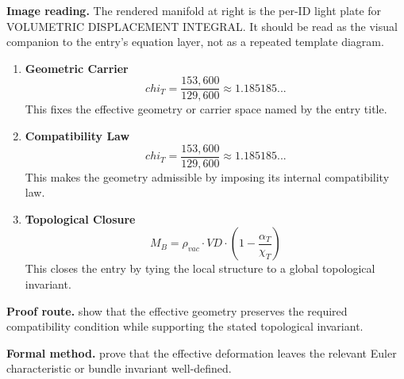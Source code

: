 \begin{samepage}
\noindent\begin{minipage}[t]{0.45\linewidth}
\vspace{0pt}
\raggedright
\scriptsize\textbf{Image reading.} The rendered manifold at right is the per-ID light plate for VOLUMETRIC DISPLACEMENT INTEGRAL. It should be read as the visual companion to the entry's equation layer, not as a repeated template diagram.\par
\end{minipage}\hfill
\begin{minipage}[t]{0.53\linewidth}
\vspace*{-0.10in}
\raggedright
{}
\end{minipage}
\end{samepage}

\clearpage


\begin{enumerate}[leftmargin=1.6em,itemsep=9pt,topsep=6pt]
\item \textbf{Geometric Carrier}
\[
chi_T = \frac{153,600}{129,600} \approx 1.185185...
\]
This fixes the effective geometry or carrier space named by the entry title.

\item \textbf{Compatibility Law}
\[
chi_T = \frac{153,600}{129,600} \approx 1.185185...
\]
This makes the geometry admissible by imposing its internal compatibility law.

\item \textbf{Topological Closure}
\[
M_B = \rho_{vac} \cdot VD \cdot \left(1 - \frac{\alpha_T}{\chi_T}\right)
\]
This closes the entry by tying the local structure to a global topological invariant.
\end{enumerate}

\textbf{Proof route.} show that the effective geometry preserves the required compatibility condition while supporting the stated topological invariant.

\textbf{Formal method.} prove that the effective deformation leaves the relevant Euler characteristic or bundle invariant well-defined.

\medskip
{}

